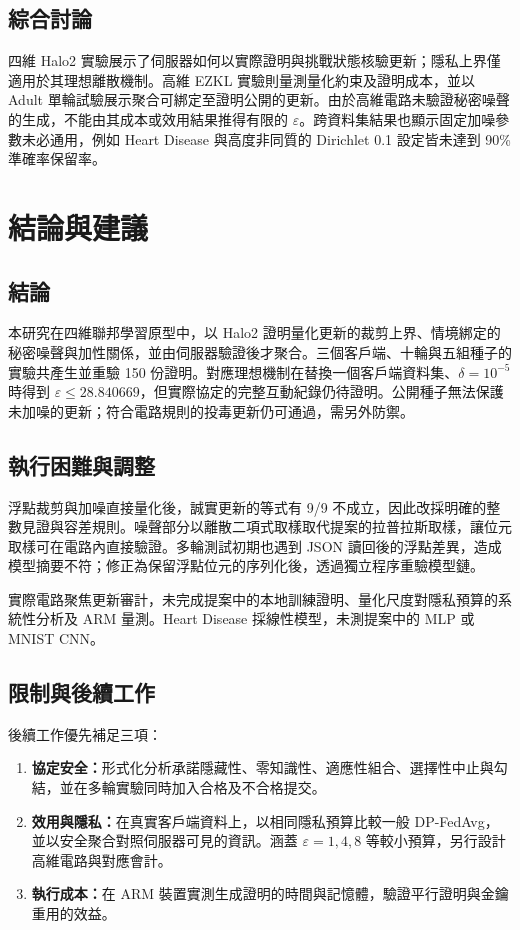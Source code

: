 \documentclass[12pt,a4paper]{article}
\newcommand{\eps}{\varepsilon}
\begin{document}
\subsection{綜合討論}
四維 Halo2 實驗展示了伺服器如何以實際證明與挑戰狀態核驗更新；隱私上界僅適用於其理想離散機制。高維 EZKL 實驗則量測量化約束及證明成本，並以 Adult 單輪試驗展示聚合可綁定至證明公開的更新。由於高維電路未驗證秘密噪聲的生成，不能由其成本或效用結果推得有限的 $\eps$。跨資料集結果也顯示固定加噪參數未必通用，例如 Heart Disease 與高度非同質的 Dirichlet 0.1 設定皆未達到 90\% 準確率保留率。

\section{結論與建議}
\subsection{結論}
本研究在四維聯邦學習原型中，以 Halo2 證明量化更新的裁剪上界、情境綁定的秘密噪聲與加性關係，並由伺服器驗證後才聚合。三個客戶端、十輪與五組種子的實驗共產生並重驗 150 份證明。對應理想機制在替換一個客戶端資料集、$\delta=10^{-5}$ 時得到 $\eps\le 28.840669$，但實際協定的完整互動紀錄仍待證明。公開種子無法保護未加噪的更新；符合電路規則的投毒更新仍可通過，需另外防禦。

\subsection{執行困難與調整}
浮點裁剪與加噪直接量化後，誠實更新的等式有 9/9 不成立，因此改採明確的整數見證與容差規則。噪聲部分以離散二項式取樣取代提案的拉普拉斯取樣，讓位元取樣可在電路內直接驗證。多輪測試初期也遇到 JSON 讀回後的浮點差異，造成模型摘要不符；修正為保留浮點位元的序列化後，透過獨立程序重驗模型鏈。

實際電路聚焦更新審計，未完成提案中的本地訓練證明、量化尺度對隱私預算的系統性分析及 ARM 量測。Heart Disease 採線性模型，未測提案中的 MLP 或 MNIST CNN。

\subsection{限制與後續工作}
後續工作優先補足三項：
\begin{enumerate}
  \item \textbf{協定安全：}形式化分析承諾隱藏性、零知識性、適應性組合、選擇性中止與勾結，並在多輪實驗同時加入合格及不合格提交。
  \item \textbf{效用與隱私：}在真實客戶端資料上，以相同隱私預算比較一般 DP-FedAvg，並以安全聚合對照伺服器可見的資訊。涵蓋 $\eps=1,4,8$ 等較小預算，另行設計高維電路與對應會計。
  \item \textbf{執行成本：}在 ARM 裝置實測生成證明的時間與記憶體，驗證平行證明與金鑰重用的效益。
\end{enumerate}
\end{document}
